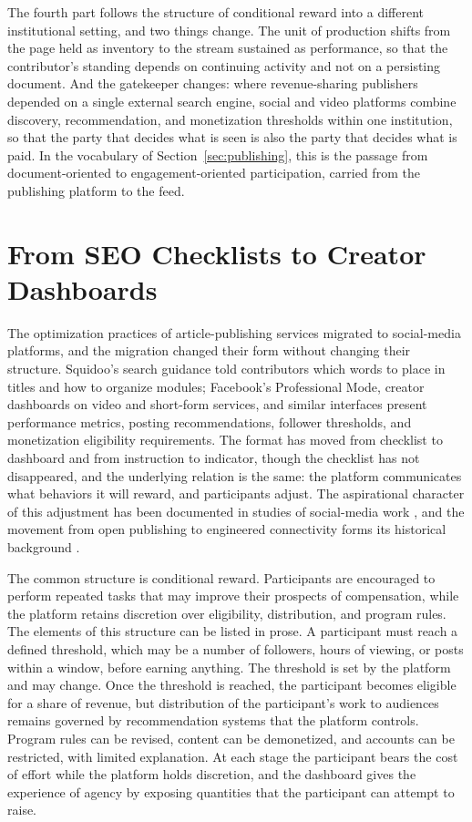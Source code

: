 \documentclass[11pt]{article}
\theoremstyle{remark}
\begin{document}
The fourth part follows the structure of conditional reward into a different institutional setting, and two things change. The unit of production shifts from the page held as inventory to the stream sustained as performance, so that the contributor's standing depends on continuing activity and not on a persisting document. And the gatekeeper changes: where revenue-sharing publishers depended on a single external search engine, social and video platforms combine discovery, recommendation, and monetization thresholds within one institution, so that the party that decides what is seen is also the party that decides what is paid. In the vocabulary of Section~\ref{sec:publishing}, this is the passage from document-oriented to engagement-oriented participation, carried from the publishing platform to the feed.

\section{From SEO Checklists to Creator Dashboards}

The optimization practices of article-publishing services migrated to social-media platforms, and the migration changed their form without changing their structure. Squidoo's search guidance told contributors which words to place in titles and how to organize modules; Facebook's Professional Mode, creator dashboards on video and short-form services, and similar interfaces present performance metrics, posting recommendations, follower thresholds, and monetization eligibility requirements. The format has moved from checklist to dashboard and from instruction to indicator, though the checklist has not disappeared, and the underlying relation is the same: the platform communicates what behaviors it will reward, and participants adjust. The aspirational character of this adjustment has been documented in studies of social-media work \cite{duffy2017}, and the movement from open publishing to engineered connectivity forms its historical background \cite{vandijck2013}.

The common structure is conditional reward. Participants are encouraged to perform repeated tasks that may improve their prospects of compensation, while the platform retains discretion over eligibility, distribution, and program rules. The elements of this structure can be listed in prose. A participant must reach a defined threshold, which may be a number of followers, hours of viewing, or posts within a window, before earning anything. The threshold is set by the platform and may change. Once the threshold is reached, the participant becomes eligible for a share of revenue, but distribution of the participant's work to audiences remains governed by recommendation systems that the platform controls. Program rules can be revised, content can be demonetized, and accounts can be restricted, with limited explanation. At each stage the participant bears the cost of effort while the platform holds discretion, and the dashboard gives the experience of agency by exposing quantities that the participant can attempt to raise.
\end{document}
